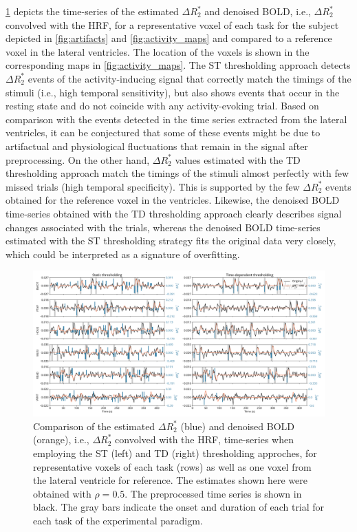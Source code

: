 \cref{fig:dr2_time_series} depicts the time-series of the estimated
$\Delta R_2^*$ and denoised BOLD, i.e., $\Delta R_2^*$ convolved with the HRF,
for a representative voxel of each task for the subject depicted in
\cref{fig:artifacts} and \cref{fig:activity_maps} and compared to a
reference voxel in the lateral ventricles. The location of the voxels is shown
in the corresponding maps in \cref{fig:activity_maps}. The ST thresholding
approach detects $\Delta R_2^*$ events of the activity-inducing signal that
correctly match the timings of the stimuli (i.e., high temporal sensitivity),
but also shows events that occur in the resting state and do not coincide with
any activity-evoking trial. Based on comparison with the events detected in the
time series extracted from the lateral ventricles, it can be conjectured that
some of these events might be due to artifactual and physiological fluctuations
that remain in the signal after preprocessing. On the other hand, $\Delta R_2^*$
values estimated with the TD thresholding approach match the timings of the
stimuli almost perfectly with few missed trials (high temporal specificity).
This is supported by the few $\Delta R_2^*$ events obtained for the reference
voxel in the ventricles. Likewise, the denoised BOLD time-series obtained with
the TD thresholding approach clearly describes signal changes associated with
the trials, whereas the denoised BOLD time-series estimated with the ST
thresholding strategy fits the original data very closely, which could be
interpreted as a signature of overfitting.

\begin{figure}[ht!]
    \centerline{\includegraphics[width=\textwidth]{figures/multivariate/dr2_time_series.png}}
    \caption{Comparison of the estimated $\Delta R_2^*$ (blue) and denoised BOLD
    (orange), i.e., $\Delta R_2^*$ convolved with the HRF, time-series when
    employing the ST (left) and TD (right) thresholding approches, for
    representative voxels of each task (rows) as well as one voxel from the
    lateral ventricle for reference. The estimates shown here were obtained with
    $\rho=0.5$. The preprocessed time series is shown in black. The gray bars
    indicate the onset and duration of each trial for each task of the
    experimental paradigm.}
\label{fig:dr2_time_series}
\end{figure}

